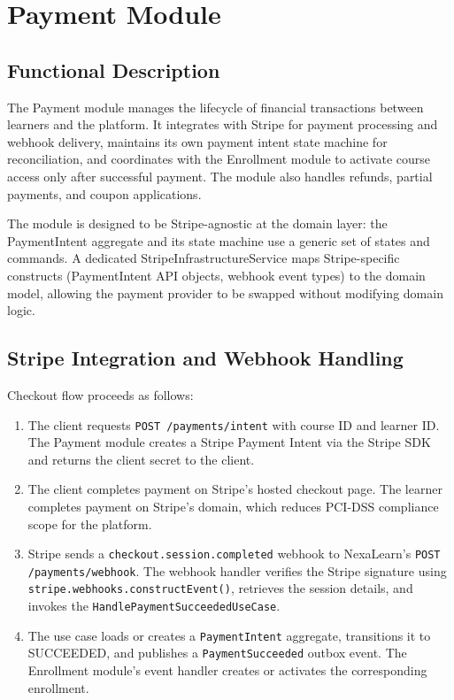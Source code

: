 
\section{Payment Module}
\label{sec:payment-module}

\subsection{Functional Description}

The Payment module manages the lifecycle of financial transactions between learners and the platform. It integrates with Stripe for payment processing and webhook delivery, maintains its own payment intent state machine for reconciliation, and coordinates with the Enrollment module to activate course access only after successful payment. The module also handles refunds, partial payments, and coupon applications.

The module is designed to be Stripe-agnostic at the domain layer: the PaymentIntent aggregate and its state machine use a generic set of states and commands. A dedicated StripeInfrastructureService maps Stripe-specific constructs (PaymentIntent API objects, webhook event types) to the domain model, allowing the payment provider to be swapped without modifying domain logic.

\subsection{Stripe Integration and Webhook Handling}

Checkout flow proceeds as follows:

\begin{enumerate}
  \item The client requests \texttt{POST /payments/intent} with course ID and learner ID. The Payment module creates a Stripe Payment Intent via the Stripe SDK and returns the client secret to the client.
  \item The client completes payment on Stripe's hosted checkout page. The learner completes payment on Stripe's domain, which reduces PCI-DSS compliance scope for the platform.
  \item Stripe sends a \texttt{checkout.session.completed} webhook to NexaLearn's \texttt{POST /payments/webhook}. The webhook handler verifies the Stripe signature using \texttt{stripe.webhooks.constructEvent()}, retrieves the session details, and invokes the \texttt{HandlePaymentSucceededUseCase}.
  \item The use case loads or creates a \texttt{PaymentIntent} aggregate, transitions it to SUCCEEDED, and publishes a \texttt{PaymentSucceeded} outbox event. The Enrollment module's event handler creates or activates the corresponding enrollment.
\end{enumerate}

